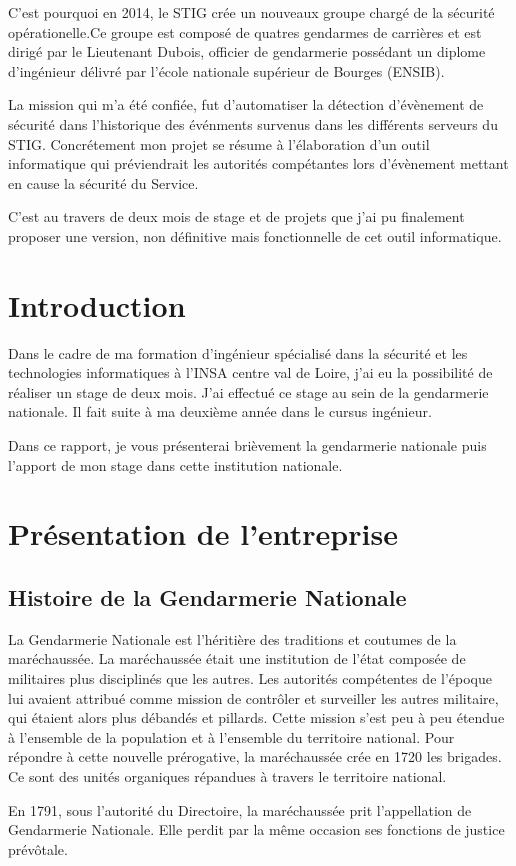 C'est pourquoi en 2014, le STIG crée un nouveaux groupe chargé de la sécurité opérationelle.Ce groupe est composé de quatres gendarmes de carrières et est dirigé par le Lieutenant Dubois, officier de gendarmerie possédant un diplome d'ingénieur délivré par l'école nationale supérieur de Bourges (ENSIB).

La mission qui m'a été confiée, fut d'automatiser la détection d'évènement de sécurité dans l'historique des événments survenus dans les différents serveurs du STIG. Concrétement mon projet se résume à l'élaboration d'un outil informatique qui préviendrait les autorités compétantes lors d'évènement mettant en cause la sécurité du Service.

C'est au travers de deux mois de stage et de projets que j'ai pu finalement proposer une version, non définitive mais fonctionnelle de cet outil informatique.
\newpage
\tableofcontents
\clearpage
\section{Introduction}
Dans le cadre de ma formation d'ingénieur spécialisé dans la sécurité et les technologies informatiques à l'INSA centre val de Loire, j'ai eu la possibilité de réaliser un stage de deux mois. J'ai effectué ce stage au sein de la gendarmerie nationale. Il fait suite à ma deuxième année dans le cursus ingénieur.

Dans ce rapport, je vous présenterai brièvement la gendarmerie nationale puis l'apport de mon stage dans cette institution nationale.
\section{Présentation de l'entreprise}
\subsection{Histoire de la Gendarmerie Nationale}
La Gendarmerie Nationale est l'héritière des traditions et coutumes de la maréchaussée. La maréchaussée était une institution de l'état composée de militaires plus disciplinés que les autres. Les autorités compétentes de l'époque lui avaient attribué comme mission de contrôler et surveiller les autres militaire, qui étaient alors plus débandés et pillards. Cette mission s'est peu à peu étendue à l'ensemble de la population et à l'ensemble du territoire national. Pour répondre à cette nouvelle prérogative, la maréchaussée crée en 1720 les brigades. Ce sont des unités organiques répandues à travers le territoire national.

En 1791, sous l'autorité du Directoire, la maréchaussée prit l'appellation de Gendarmerie Nationale. Elle perdit par la même occasion ses fonctions de justice prévôtale.


